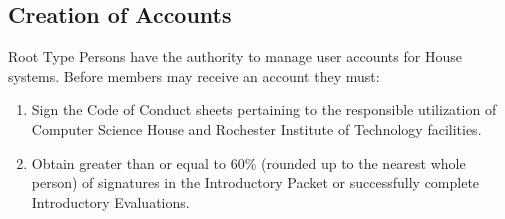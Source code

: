 \documentclass{article}
\newcommand{\bsection}[1]{\subsection{#1} \label{#1}}
\begin{document}
\bsection{Creation of Accounts}
Root Type Persons have the authority to manage user accounts for House systems. Before members may receive an account they must:
\renewcommand{\theenumi}{\alph{enumi}} %
\begin{enumerate}
	\item Sign the Code of Conduct sheets pertaining to the responsible utilization of Computer Science House and Rochester Institute of Technology facilities.
	\item Obtain greater than or equal to 60\% (rounded up to the nearest whole person) of signatures in the Introductory Packet or successfully complete Introductory Evaluations.
\end{enumerate}
\end{document}
